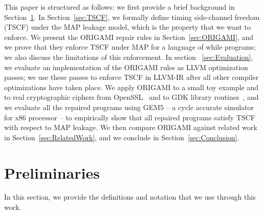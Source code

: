 {
This paper is structured as follows: we first provide a brief background in Section~\ref{sec:Preliminaries}. In Section~\ref{sec:TSCF}, we formally define timing side-channel freedom (TSCF) under the MAP leakage model, which is the property that we want to enforce. We present the ORIGAMI repair rules in Section~\ref{sec:ORIGAMI}, and we prove that they enforce TSCF under MAP for a language of while programs; we also discuss the limitations of this enforcement. In section ~\ref{sec:Evaluation}, we evaluate an implementation of the ORIGAMI rules as LLVM optimization passes; we use these passes to enforce TSCF in LLVM-IR after all other compiler optimizations have taken place. We apply ORIGAMI to a small toy example and to real cryptographic ciphers from OpenSSL~\cite{OpenSSL} and to GDK library routines~\cite{gdklib,gdklib}, and we evaluate all the repaired programs using GEM5 -- a cycle accurate simulator for x86 processor -- to empirically show that all repaired programs satisfy TSCF with respect to MAP leakage. We then compare ORIGAMI against related work  in Section~\ref{sec:RelatedWork}, and we conclude in 
Section~\ref{sec:Conclusion}. 
}
\section{Preliminaries}
\label{sec:Preliminaries}
In this section, we provide the definitions and notation that we use through this work. 
 
